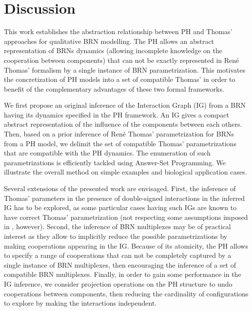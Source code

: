 \section{Discussion}

This work establishes the abstraction relationship between PH and Thomas' approaches for
qualitative BRN modelling.
The PH allows an abstract representation of BRNs dynamics (allowing incomplete knowledge on the
cooperation between components) that can not be exactly represented in Ren\'e Thomas' formalism by a
single instance of BRN parametrization.
This motivates the concretization of PH models into a set of compatible Thomas' in order to benefit
of the complementary advantages of these two formal frameworks.

We first propose an original inference of the Interaction Graph (IG) from a BRN
having its dynamics specified in the PH framework.
An IG gives a compact abstract representation of the influence of the components between each
others.
Then, based on a prior inference of Ren\'e Thomas' parametrization for BRNs from a PH model, we
delimit the set of compatible Thomas' parametrizations that are compatible with the PH dynamics.
The enumeration of such parametrizations is efficiently tackled using Answer-Set Programming.
We illustrate the overall method on simple examples and biological application cases.

Several extensions of the presented work are envisaged.
First, the inference of Thomas' parameters in the presence of double-signed interactions in the
inferred IG has to be explored, as some particular cases having such IGs are known to have correct
Thomas' parametrization (not respecting some assumptions imposed in ,
however).
Second, the inference of BRN multiplexes \cite{BernotMultiplexes} may be of practical interest 
as they allow to implicitly reduce the possible parametrizations by making cooperations appearing
in the IG.
Because of its atomicity, the PH allows to specify a range of cooperations that can not be
completely captured by a single instance of BRN multiplexes, then encouraging the inference of a set
of compatible BRN multiplexes.
Finally, in order to gain some performance in the IG inference, we consider projection operations on
the PH structure to undo cooperations between components, then reducing the cardinality of
configurations to explore by making the interactions independent.

